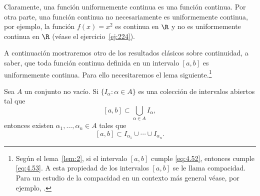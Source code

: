 \documentclass[12pt,a4paper]{book}
\begin{document}
    Claramente, una función uniformemente continua es una función continua.
    Por otra parte, una función continua no necesariamente es uniformemente
    continua, por ejemplo, la función $f(x)=x^{2}$ es continua en $\R$ y no es
    uniformemente continua en $\R$ (véase el ejercicio~\ref{ej:224}).

    A continuación mostraremos otro de los resultados clásicos sobre continuidad,
    a saber, que toda función continua definida en un intervalo $[a,b]$ es
    uniformemente continua. Para ello necesitaremos el lema siguiente.\footnote{Según el lema~\ref{lem:2}, si el intervalo $[a,b]$ cumple \eqref{eq:4.52}, entonces cumple \eqref{eq:4.53}. A esta
    propiedad de los intervalos $[a,b]$ se le llama compacidad. Para un estudio de la compacidad
    en un contexto más general véase, por ejemplo, \cite{nunez2020analisis}.}

    \begin{lema}\label{lem:2}
        Sea $A$ un conjunto no vacío. Si $\{I_{\alpha}:\alpha\in A\}$ es una colección de
        intervalos abiertos tal que
        \begin{equation}\label{eq:4.52}
            [a,b]\subset\bigcup_{\alpha\in A}I_{\alpha},
        \end{equation}
        entonces existen $\alpha_{1},\ldots,\alpha_{n}\in A$ tales que
        \begin{equation}\label{eq:4.53}
            [a,b]\subset I_{\alpha_{1}}\cup\cdots\cup I_{\alpha_{n}}.
        \end{equation}
    \end{lema}
\end{document}
